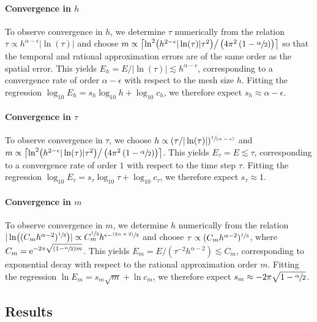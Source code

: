 \documentclass[numbers,webpdf]{ima-authoring-template}%
\theoremstyle{thmstyletwo}%
\numberwithin{equation}{section}
\begin{document}
\paragraph{Convergence in $h$}
\label{convh}
To observe convergence in $h$, we determine $\tau$ numerically from the relation $\tau\propto h^{\alpha-\epsilon}|\ln(\tau)|$ and choose $m\propto\left\lceil\ln^2\bigl(h^{2-\epsilon}|\ln(\tau)|\tau^2\bigr)\big/\left(4\pi^2\left(1-\sfrac{\alpha}{2}\right)\right)\right\rceil$ so that the temporal and rational approximation errors are of the same order as the spatial error. This yields $E_h=E/|\ln(\tau)|\lesssim h^{\alpha-\epsilon}$, corresponding to a convergence rate of order $\alpha-\epsilon$ with respect to the mesh size $h$. Fitting the regression $\log_{10}E_h=s_h\log_{10}h+\log_{10}c_h$, we therefore expect $s_h\approx\alpha-\epsilon$.

\paragraph{Convergence in $\tau$}
\label{convtau}
To observe convergence in $\tau$, we choose $h \propto (\tau/|\ln(\tau)|)^{\sfrac{1}{(\alpha-\epsilon)}}$ and $m\propto\left\lceil\ln^2\bigl(h^{2-\epsilon}|\ln(\tau)|\tau^{2}\bigr)\big/\left(4\pi^2\left(1-\sfrac{\alpha}{2}\right)\right)\right\rceil$. This yields $E_\tau = E\lesssim\tau$, corresponding to a convergence rate of order $1$ with respect to the time step $\tau$. Fitting the regression $\log_{10}E_\tau=s_\tau\log_{10}\tau+\log_{10}c_\tau$, we therefore expect $s_\tau\approx1$.


\paragraph{Convergence in $m$} 
\label{convm}
To observe convergence in $m$, we determine $h$ numerically from the relation $|\ln((C_mh^{\alpha-2})^{\sfrac{1}{3}})| \propto C_m^{\sfrac{1}{3}}h^{\epsilon-\sfrac{(2\alpha+2)}{3}}$ and choose $\tau \propto (C_mh^{\alpha-2})^{\sfrac{1}{3}}$, where $C_m = \mathrm{e}^{-2\pi\sqrt{(1-\sfrac{\alpha}{2})m}}$. This yields $E_m = E/(\tau^{-2}h^{\alpha-2})\lesssim C_m$, corresponding to exponential decay with respect to the rational approximation order $m$. Fitting the regression $\ln E_m = s_m\sqrt{m} +\ln c_m$, we therefore expect $s_m\approx -2\pi\sqrt{1-\sfrac{\alpha}{2}}$.

\subsection{Results}
\end{document}
